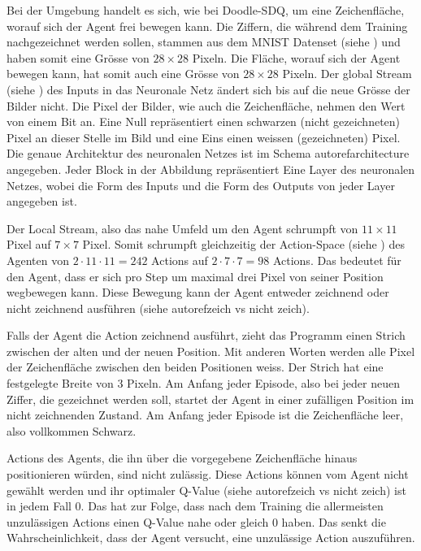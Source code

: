 Bei der Umgebung handelt es sich, wie bei Doodle-SDQ, um eine Zeichenfläche,
worauf sich der Agent frei bewegen kann. Die Ziffern, die während dem Training
nachgezeichnet werden sollen, stammen aus dem MNIST Datenset (siehe
) und haben somit eine Grösse von $28\times28$ Pixeln. Die
Fläche, worauf sich der Agent bewegen   
kann, hat somit auch eine Grösse von $28\times28$ Pixeln. Der global Stream
(siehe ) des Inputs in das Neuronale Netz ändert sich
bis auf die neue Grösse der Bilder nicht. Die Pixel der Bilder, wie auch die
Zeichenfläche, nehmen den Wert von einem Bit an. Eine Null repräsentiert einen
schwarzen (nicht gezeichneten) Pixel an dieser Stelle im Bild und eine Eins
einen weissen (gezeichneten) Pixel. Die genaue Architektur des neuronalen Netzes
ist im Schema autoref{architecture} angegeben. Jeder Block in der Abbildung
repräsentiert Eine Layer des neuronalen Netzes, wobei die Form des Inputs und
die Form des Outputs von jeder Layer angegeben ist. 


Der Local Stream, also das nahe Umfeld um den Agent schrumpft von $11\times11$
Pixel auf $7\times7$ Pixel. Somit schrumpft gleichzeitig der Action-Space (siehe
) des Agenten von $2\cdot11\cdot11 = 242$ Actions auf
$2\cdot7\cdot7 = 98$ Actions. Das bedeutet für den Agent, dass er sich pro Step
um maximal drei Pixel von seiner Position wegbewegen kann. Diese Bewegung kann
der Agent entweder zeichnend oder nicht zeichnend ausführen (siehe autoref{zeich
vs nicht zeich}).


Falls der Agent die Action zeichnend ausführt, zieht das Programm einen Strich
zwischen der alten und der neuen Position. Mit anderen Worten werden alle Pixel
der Zeichenfläche zwischen den beiden Positionen weiss. Der Strich hat eine
festgelegte Breite von $3$ Pixeln. Am Anfang jeder Episode, also bei jeder neuen
Ziffer, die gezeichnet werden soll, startet der Agent in einer zufälligen
Position im nicht zeichnenden Zustand. Am Anfang jeder Episode ist die
Zeichenfläche leer, also vollkommen Schwarz.

Actions des Agents, die ihn über die vorgegebene Zeichenfläche hinaus
positionieren würden, sind nicht zulässig. Diese Actions können vom Agent nicht
gewählt werden und ihr optimaler Q-Value (siehe autoref{zeich vs nicht zeich})
ist in jedem Fall $0$. Das hat zur Folge, dass nach dem Training die
allermeisten unzulässigen Actions einen Q-Value nahe oder gleich $0$ haben. Das
senkt die Wahrscheinlichkeit, dass der Agent versucht, eine unzulässige Action
auszuführen.

